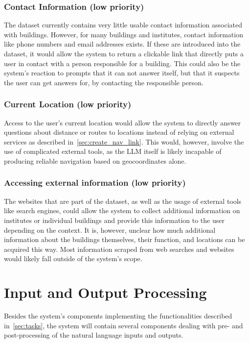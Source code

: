 \documentclass{article}
\begin{document}
\subsubsection{Contact Information (low priority)}
The dataset currently contains very little usable contact information associated with buildings. However, for many buildings and institutes, contact information like phone numbers and email addresses exists. If these are introduced into the dataset, it would allow the system to return a clickable link that directly puts a user in contact with a person responsible for a building. This could also be the system's reaction to prompts that it can not answer itself, but that it suspects the user can get answers for, by contacting the responsible person.

\subsubsection{Current Location (low priority)} \label{sec:curr_loc}
Access to the user's current location would allow the system to directly answer questions about distance or routes to locations instead of relying on external services as described in~\cref{sec:create_nav_link}. This would, however, involve the use of complicated external tools, as the LLM itself is likely incapable of producing reliable navigation based on geocoordinates alone.

\subsubsection{Accessing external information (low priority)}
The websites that are part of the dataset, as well as the usage of external tools like search engines, could allow the system to collect additional information on institutes or individual buildings and provide this information to the user depending on the context. It is, however, unclear how much additional information about the buildings themselves, their function, and locations can be acquired this way. Most information scraped from web searches and websites would likely fall outside of the system's scope.

\section{Input and Output Processing}
Besides the system's components implementing the functionalities described in~\cref{sec:tasks}, the system will contain several components dealing with pre- and post-processing of the natural language inputs and outputs.
\end{document}
